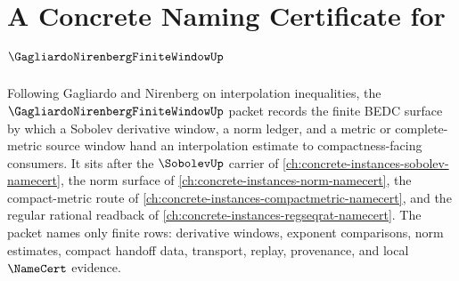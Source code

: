 \chapter{A Concrete Naming Certificate for $\GagliardoNirenbergFiniteWindowUp$}
\label{ch:concrete-instances-gagliardo-nirenberg-finite-window-namecert}

Following Gagliardo and Nirenberg on interpolation inequalities, the $\GagliardoNirenbergFiniteWindowUp$ packet records the finite BEDC surface by which a Sobolev derivative window, a norm ledger, and a metric or complete-metric source window hand an interpolation estimate to compactness-facing consumers. It sits after the $\SobolevUp$ carrier of \autoref{ch:concrete-instances-sobolev-namecert}, the norm surface of \autoref{ch:concrete-instances-norm-namecert}, the compact-metric route of \autoref{ch:concrete-instances-compactmetric-namecert}, and the regular rational readback of \autoref{ch:concrete-instances-regseqrat-namecert}. The packet names only finite rows: derivative windows, exponent comparisons, norm estimates, compact handoff data, transport, replay, provenance, and local $\NameCert$ evidence.

